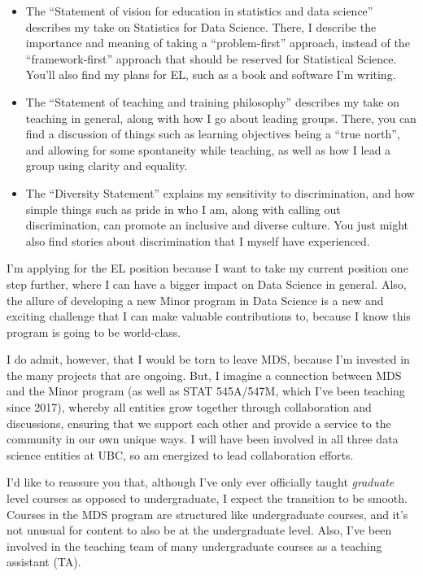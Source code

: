 \documentclass[]{article}
\providecommand{\tightlist}{%
  \setlength{\itemsep}{0pt}\setlength{\parskip}{0pt}}
\begin{document}
\begin{itemize}
\tightlist
\item
  The ``Statement of vision for education in statistics and data science'' describes my take on Statistics for Data Science. There, I describe the importance and meaning of taking a ``problem-first'' approach, instead of the ``framework-first'' approach that should be reserved for Statistical Science. You'll also find my plans for EL, such as a book and software I'm writing.
\item
  The ``Statement of teaching and training philosophy'' describes my take on teaching in general, along with how I go about leading groups. There, you can find a discussion of things such as learning objectives being a ``true north'', and allowing for some spontaneity while teaching, as well as how I lead a group using clarity and equality.
\item
  The ``Diversity Statement'' explains my sensitivity to discrimination, and how simple things such as pride in who I am, along with calling out discrimination, can promote an inclusive and diverse culture. You just might also find stories about discrimination that I myself have experienced.
\end{itemize}

I'm applying for the EL position because I want to take my current position one step further, where I can have a bigger impact on Data Science in general. Also, the allure of developing a new Minor program in Data Science is a new and exciting challenge that I can make valuable contributions to, because I know this program is going to be world-class.

I do admit, however, that I would be torn to leave MDS, because I'm invested in the many projects that are ongoing. But, I imagine a connection between MDS and the Minor program (as well as STAT 545A/547M, which I've been teaching since 2017), whereby all entities grow together through collaboration and discussions, ensuring that we support each other and provide a service to the community in our own unique ways. I will have been involved in all three data science entities at UBC, so am energized to lead collaboration efforts.

I'd like to reassure you that, although I've only ever officially taught \emph{graduate} level courses as opposed to undergraduate, I expect the transition to be smooth. Courses in the MDS program are structured like undergraduate courses, and it's not unusual for content to also be at the undergraduate level. Also, I've been involved in the teaching team of many undergraduate courses as a teaching assistant (TA).
\end{document}
